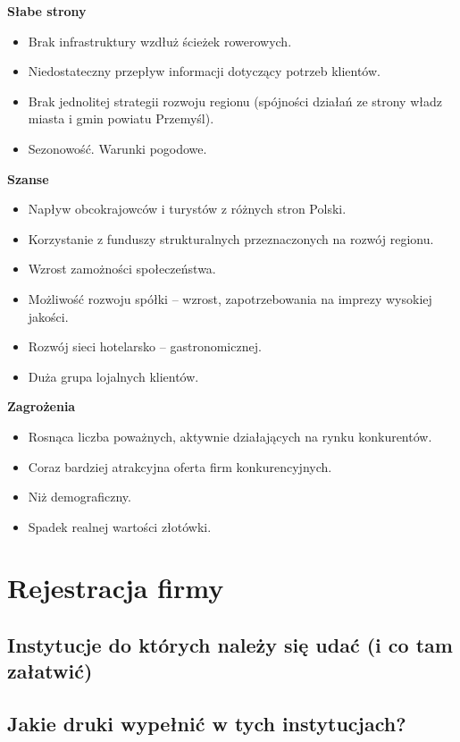 \documentclass{sprawozdanie-agh}
\begin{document}
		\textbf{Słabe strony}
		\begin{itemize}
			\item Brak infrastruktury wzdłuż ścieżek rowerowych.
			\item Niedostateczny przepływ informacji dotyczący potrzeb klientów.
			\item Brak jednolitej strategii rozwoju regionu (spójności działań ze strony władz miasta i gmin powiatu Przemyśl).
			\item Sezonowość.
			 Warunki pogodowe.
		\end{itemize}
	
		\textbf{Szanse}
		\begin{itemize}
			\item Napływ obcokrajowców i turystów z różnych stron Polski.
			\item Korzystanie z funduszy strukturalnych przeznaczonych na rozwój regionu.
			\item Wzrost zamożności społeczeństwa.
			\item Możliwość rozwoju spółki – wzrost, zapotrzebowania na imprezy wysokiej jakości.
			\item Rozwój sieci hotelarsko – gastronomicznej.
			\item Duża grupa lojalnych klientów.
		\end{itemize}
		\textbf{Zagrożenia}
		\begin{itemize}
			\item Rosnąca liczba poważnych, aktywnie działających na rynku konkurentów.
			\item Coraz bardziej atrakcyjna oferta firm konkurencyjnych.
			\item Niż demograficzny.
			\item Spadek realnej wartości złotówki.
		\end{itemize}

	\section{Rejestracja firmy}

		\subsection{Instytucje do których należy się udać (i co tam załatwić)}
		\subsection{Jakie druki wypełnić w tych instytucjach?}
\end{document}
